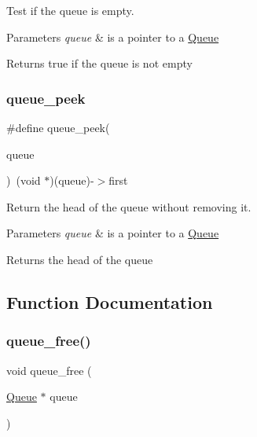 Test if the queue is empty. 


\begin{DoxyParams}{Parameters}
{\em queue} & is a pointer to a \hyperlink{structQueue}{Queue} \\
\hline
\end{DoxyParams}
\begin{DoxyReturn}{Returns}
true if the queue is not empty 
\end{DoxyReturn}
\mbox{\label{group__queue_gab4e9f523209630c13dec04655bfacc49}} 
\subsubsection{\texorpdfstring{queue\+\_\+peek}{queue\_peek}}
{\footnotesize\ttfamily \#define queue\+\_\+peek(\begin{DoxyParamCaption}\item[{}]{queue }\end{DoxyParamCaption})~(void $\ast$)(queue)-\/$>$first}



Return the head of the queue without removing it. 


\begin{DoxyParams}{Parameters}
{\em queue} & is a pointer to a \hyperlink{structQueue}{Queue} \\
\hline
\end{DoxyParams}
\begin{DoxyReturn}{Returns}
the head of the queue 
\end{DoxyReturn}


\subsection{Function Documentation}
\mbox{\label{group__queue_ga42c7cc8caeb6778234887511db8fba40}} 
\subsubsection{\texorpdfstring{queue\+\_\+free()}{queue\_free()}}
{\footnotesize\ttfamily void queue\+\_\+free (\begin{DoxyParamCaption}\item[{\hyperlink{structQueue}{Queue} $\ast$}]{queue }\end{DoxyParamCaption})}



